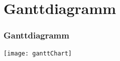 \section{Ganttdiagramm}
\begin{frame}
	\frametitle{Ganttdiagramm}
	\centering
	{\texttt{[image: ganttChart]}}
\end{frame}